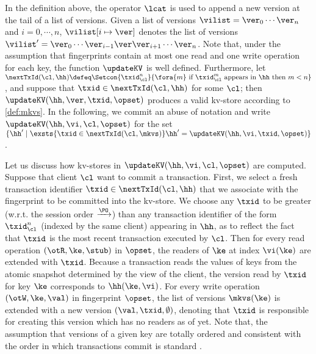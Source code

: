 In the definition above, the operator $\lcat$ is used to append a new version at the tail of 
a list of versions. Given a list of versions $\vilist = \ver_0\cdots \ver_n$ and $i=0,\cdots,n$, 
$\vilist[i \mapsto \ver]$ denotes the list of versions $\vilist' = \ver_0 \cdots \ver_{i-1} \ver \ver_{i+1} \cdots 
\ver_{n}$. 
Note that, under the assumption that fingerprints contain at most one read and one write 
operation for each key, the function $\updateKV$ is well defined. Furthermore, 
let $\nextTxId(\cl, \hh) \defeq
\Setcon{\txid_{\cl}^{n}}{\fora{m} \text{ if } \txid_{\cl}^{m} \text{ appears in } \hh \text{ then } m < n }$, 
and suppose that $\txid \in \nextTxId(\cl, \hh)$ for some $\cl$;
then $\updateKV(\hh, \ver, \txid, \opset)$ produces a valid kv-store according to \cref{def:mkvs}.
In the following, we commit an abuse of notation and write $\updateKV(\hh, \vi, \cl, \opset)$ 
for the set $\{\hh' \mid \exsts { \txid \in \nextTxId(\cl, \mkvs) } \hh' = \updateKV(\hh, \vi, \txid, \opset)\}$.

Let us discuss how kv-stores in $\updateKV(\hh, \vi, \cl, \opset)$ are computed. 
Suppose that client \( \cl \) want to commit a transaction.
First, we select a fresh transaction identifier $\txid \in \nextTxId(\cl, \hh)$ that we associate 
with the fingerprint to be committed into the kv-store. We choose any $\txid$ to be 
greater (w.r.t. the session order $\xrightarrow{\PO}$) than any transaction identifier 
of the form $\txid_{\cl}^{n}$ (indexed by the same client) appearing in $\hh$,
as to reflect the fact that $\txid$ is the most recent transaction executed by $\cl$.
Then for every read operation $(\otR, \ke, \stub)$ in $\opset$,
the readers of $\ke$ at index $\vi(\ke)$ are extended with $\txid$.
Because a transaction reads the values of keys from the atomic 
snapshot determined by the view of the client, the version read by $\txid$ for key $\ke$ 
corresponds to $\hh(\ke, \vi)$.
For every write operation $(\otW, \ke, \val)$ in fingerprint $\opset$, 
the list of versions $\mkvs(\ke)$ is extended with a new version $(\val, \txid, \emptyset)$, 
denoting that $\txid$ is responsible for creating this version which has no readers as of yet. 
Note that, the assumption that versions of 
a given key are totally ordered and consistent with the order in which 
transactions commit is standard \cite{adya,framework-concur,seebelieve}. 

